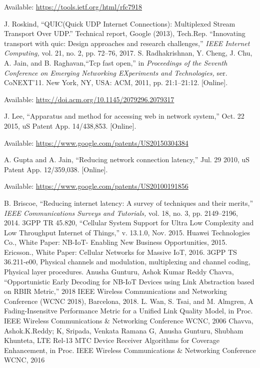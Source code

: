 \begin{multicols}{2}
\begin{thebibliography}{99}
Available: \url{https://tools.ietf.org/html/rfc7918}

 J. Roskind, “QUIC(Quick UDP Internet Connections): Multiplexed Stream Transport Over UDP.” Technical report, Google (2013), Tech.Rep.
 “Innovating transport with quic: Design approaches and research challenges,” \textit{IEEE Internet Computing,} vol. 21, no. 2, pp. 72–76, 2017.
 S. Radhakrishnan, Y. Cheng, J. Chu, A. Jain, and B. Raghavan,“Tcp fast open,” in \textit{Proceedings of the Seventh Conference on Emerging Networking EXperiments and Technologies,} ser. CoNEXT’11. New York, NY, USA: ACM, 2011, pp. 21:1–21:12. [Online].

Available: \url{http://doi.acm.org/10.1145/2079296.2079317}

 J. Lee, “Apparatus and method for accessing web in network system,” Oct. 22 2015, uS Patent App. 14/438,853. [Online].

Available: \url{https://www.google.com/patents/US20150304384}

 A. Gupta and A. Jain, “Reducing network connection latency,” Jul. 29 2010, uS Patent App. 12/359,038. [Online]. 

Available: \url{https://www.google.com/patents/US20100191856}

 B. Briscoe, “Reducing internet latency: A survey of techniques and their merits,” \textit{IEEE Communications Surveys and Tutorials,} vol. 18, no. 3, pp. 2149–2196, 2014.
 3GPP TR 45.820, ``Cellular System Support for Ultra Low Complexity and Low Throughput Internet of Things,” v. 13.1.0, Nov. 2015.
 Huawei Technologies Co., White Paper: NB-IoT- Enabling New Business Opportunities, 2015.
 Ericsson., White Paper: Cellular Networks for Massive IoT, 2016.
 3GPP TS 36.211-e00, Physical channels and modulation, multiplexing and channel coding, Physical layer procedures. 
 Anusha Gunturu, Ashok Kumar Reddy Chavva, “Opportunistic Early Decoding for NB-IoT Devices using Link Abstraction based on RBIR Metric,” 2018 IEEE Wireless Communications and Networking Conference (WCNC 2018), Barcelona, 2018. 
 L. Wan, S. Tsai, and M. Almgren, A Fading-Insensitve Performance Metric for a Unified Link Quality Model, in Proc. IEEE Wireless Communications \& Networking Conference WCNC, 2006 
 Chavva, Ashok.K.Reddy; K, Sripada, Venkata Ramana G, Anusha Gunturu, Shubham Khunteta, LTE Rel-13 MTC Device Receiver Algorithms for Coverage Enhancement, in Proc. IEEE Wireless Communications \& Networking Conference WCNC, 2016
\end{thebibliography}
\end{multicols}

